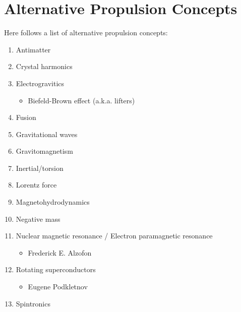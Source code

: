 \part{Alternative Propulsion Concepts}

Here follows a list of alternative propulsion concepts:

\begin{enumerate}
	\item Antimatter
	\item Crystal harmonics
	\item Electrogravitics
	\begin{itemize}
		\item Biefeld-Brown effect (a.k.a. lifters)
	\end{itemize}
	\item Fusion
	\item Gravitational waves
	\item Gravitomagnetism
	\item Inertial/torsion
	\item Lorentz force
	\item Magnetohydrodynamics
	\item Negative mass
	\item Nuclear magnetic resonance / Electron paramagnetic resonance
	\begin{itemize}
		\item Frederick E. Alzofon
	\end{itemize}
	\item Rotating superconductors
	\begin{itemize}
		\item Eugene Podkletnov
	\end{itemize}
	\item Spintronics
\end{enumerate}